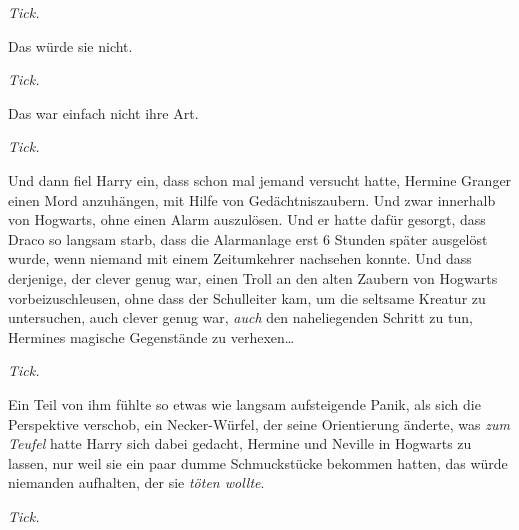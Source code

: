 \emph{Tick.}

Das würde sie nicht.

\emph{Tick.}

Das war einfach nicht ihre Art.

\emph{Tick.}

Und dann fiel Harry ein, dass schon mal jemand versucht hatte, Hermine Granger einen Mord anzuhängen, mit Hilfe von Gedächtniszaubern. Und zwar innerhalb von Hogwarts, ohne einen Alarm auszulösen. Und er hatte dafür gesorgt, dass Draco so langsam starb, dass die Alarmanlage erst 6 Stunden später ausgelöst wurde, wenn niemand mit einem Zeitumkehrer nachsehen konnte. Und dass derjenige, der clever genug war, einen Troll an den alten Zaubern von Hogwarts vorbeizuschleusen, ohne dass der Schulleiter kam, um die seltsame Kreatur zu untersuchen, auch clever genug war, \emph{auch} den naheliegenden Schritt zu tun, Hermines magische Gegenstände zu verhexen…

\emph{Tick.}

Ein Teil von ihm fühlte so etwas wie langsam aufsteigende Panik, als sich die Perspektive verschob, ein Necker-Würfel, der seine Orientierung änderte, was \emph{zum Teufel} hatte Harry sich dabei gedacht, Hermine und Neville in Hogwarts zu lassen, nur weil sie ein paar dumme Schmuckstücke bekommen hatten, das würde niemanden aufhalten, der sie \emph{töten wollte}.

\emph{Tick.}

